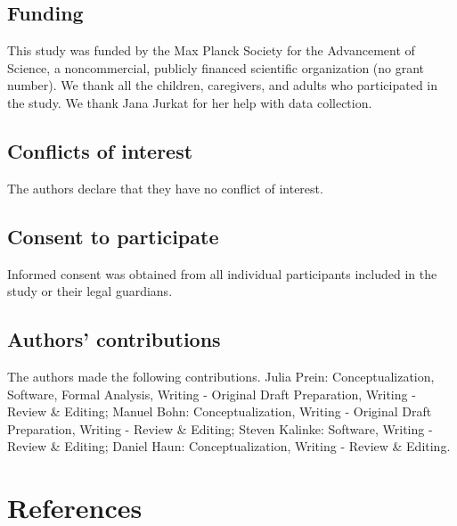 \documentclass[
  man,floatsintext]{apa7}
\begin{document}
\hypertarget{funding}{%
\subsection{Funding}\label{funding}}

This study was funded by the Max Planck Society for the Advancement of Science, a noncommercial, publicly financed scientific organization (no grant number).
We thank all the children, caregivers, and adults who participated in the study.
We thank Jana Jurkat for her help with data collection.

\hypertarget{conflicts-of-interest}{%
\subsection{Conflicts of interest}\label{conflicts-of-interest}}

The authors declare that they have no conflict of interest.

\hypertarget{consent-to-participate}{%
\subsection{Consent to participate}\label{consent-to-participate}}

Informed consent was obtained from all individual participants included in the study or their legal guardians.

\hypertarget{authors-contributions}{%
\subsection{Authors' contributions}\label{authors-contributions}}

The authors made the following contributions.
Julia Prein: Conceptualization, Software, Formal Analysis, Writing - Original Draft Preparation, Writing - Review \& Editing; Manuel Bohn: Conceptualization, Writing - Original Draft Preparation, Writing - Review \& Editing; Steven Kalinke: Software, Writing - Review \& Editing; Daniel Haun: Conceptualization, Writing - Review \& Editing.

\newpage

\hypertarget{references}{%
\section{References}\label{references}}

\begingroup
\setlength{\parindent}{-0.5in}
\setlength{\leftskip}{0.5in}
\end{document}
